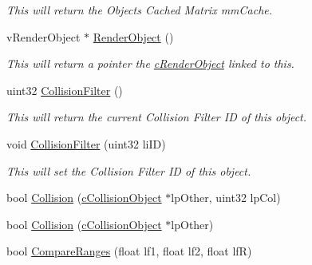 \begin{DoxyCompactItemize}
\begin{DoxyCompactList}\small\item\em This will return the Objects Cached Matrix mmCache. \end{DoxyCompactList}\item 
\hypertarget{classc_collision_object_a959994c60b68de6be85dcc663228bab8}{
vRenderObject $\ast$ \hyperlink{classc_collision_object_a959994c60b68de6be85dcc663228bab8}{RenderObject} ()}
\label{classc_collision_object_a959994c60b68de6be85dcc663228bab8}

\begin{DoxyCompactList}\small\item\em This will return a pointer the \hyperlink{classc_render_object}{cRenderObject} linked to this. \end{DoxyCompactList}\item 
\hypertarget{classc_collision_object_a1490cdf75c8037049bfa7891aa8756b7}{
uint32 \hyperlink{classc_collision_object_a1490cdf75c8037049bfa7891aa8756b7}{CollisionFilter} ()}
\label{classc_collision_object_a1490cdf75c8037049bfa7891aa8756b7}

\begin{DoxyCompactList}\small\item\em This will return the current Collision Filter ID of this object. \end{DoxyCompactList}\item 
\hypertarget{classc_collision_object_a2a527f445a899adafbf18dddf140e179}{
void \hyperlink{classc_collision_object_a2a527f445a899adafbf18dddf140e179}{CollisionFilter} (uint32 liID)}
\label{classc_collision_object_a2a527f445a899adafbf18dddf140e179}

\begin{DoxyCompactList}\small\item\em This will set the Collision Filter ID of this object. \end{DoxyCompactList}\item 
bool \hyperlink{classc_collision_object_ae9f62c64221d8cc347010fed3cf6e8d1}{Collision} (\hyperlink{classc_collision_object}{cCollisionObject} $\ast$lpOther, uint32 lpCol)
\item 
bool \hyperlink{classc_collision_object_abf62376a5806d878b5810acfd40bc450}{Collision} (\hyperlink{classc_collision_object}{cCollisionObject} $\ast$lpOther)
\item 
\hypertarget{classc_collision_object_acc8e58a747eba8e5c7903c8d769b9b31}{
bool \hyperlink{classc_collision_object_acc8e58a747eba8e5c7903c8d769b9b31}{CompareRanges} (float lf1, float lf2, float lfR)}
\label{classc_collision_object_acc8e58a747eba8e5c7903c8d769b9b31}


\end{DoxyCompactItemize}
